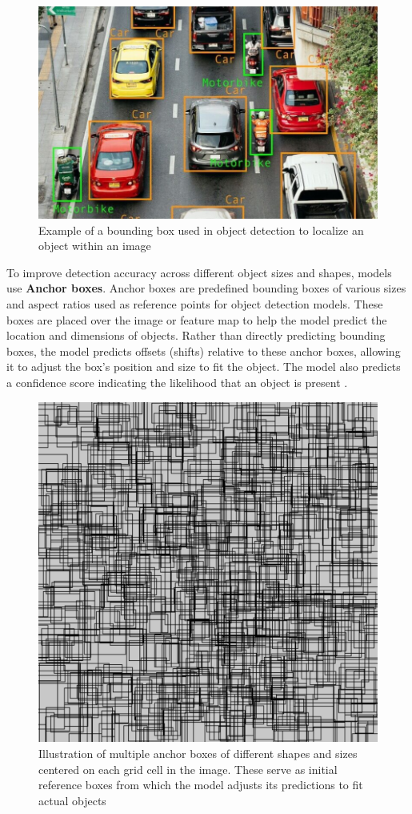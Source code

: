 \newpage

\begin{figure}[h!]
    \centering
    \includegraphics[width=0.75\linewidth]{figures/theory/image-recognition/bbox-example.png}
    \caption[Example of a bounding box in object detection]{Example of a bounding box used in object detection to localize an object within an image \cite{peopleforai:boundingbox}}
    \label{fig:boundingbox}
\end{figure}

To improve detection accuracy across different object sizes and shapes, models use \textbf{Anchor boxes}. Anchor boxes are predefined bounding boxes of various sizes and aspect ratios used as reference points for object detection models. These boxes are placed over the image or feature map to help the model predict the location and dimensions of objects. Rather than directly predicting bounding boxes, the model predicts offsets (shifts) relative to these anchor boxes, allowing it to adjust the box's position and size to fit the object. The model also predicts a confidence score indicating the likelihood that an object is present \cite{thinkautonomous:anchorboxes}.

\newpage

\begin{figure}[h!]
    \centering
    \includegraphics[width=0.7\linewidth]{figures/theory/image-recognition/anchor-boxes.png}
    \caption[Example of anchor boxes in object detection]{Illustration of multiple anchor boxes of different shapes and sizes centered on each grid cell in the image. These serve as initial reference boxes from which the model adjusts its predictions to fit actual objects
    \cite{thinkautonomous:anchorboxes}}
    \label{fig:anchor-box}
\end{figure}

